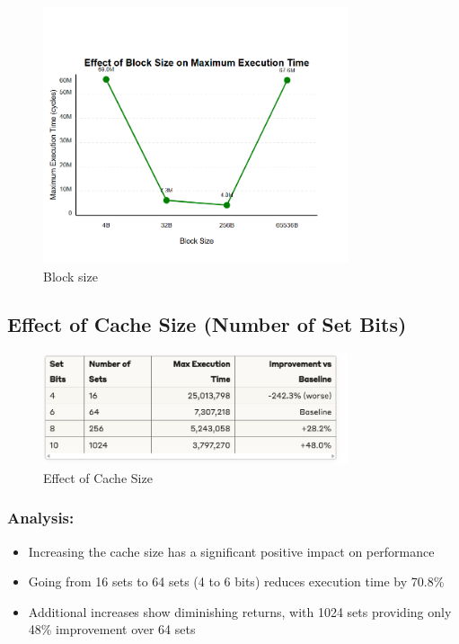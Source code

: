 \documentclass[12pt,a4paper]{article}
\begin{document}
\begin{figure}[H]
    \centering
    \includegraphics[width=0.8\textwidth]{image3_s3.png}
    \caption{Block size}
    \label{fig:block-size}
\end{figure}

\subsection{Effect of Cache Size (Number of Set Bits)}

\begin{figure}[H]
    \centering
    \includegraphics[width=0.8\textwidth]{image4_s3.png}
    \caption{Effect of Cache Size}
    \label{fig:cache-size}
\end{figure}

\subsubsection*{Analysis:}
\begin{itemize}
    \item Increasing the cache size has a significant positive impact on performance
    \item Going from 16 sets to 64 sets (4 to 6 bits) reduces execution time by 70.8\%
    \item Additional increases show diminishing returns, with 1024 sets providing only 48\% improvement over 64 sets
\end{itemize}
\end{document}
